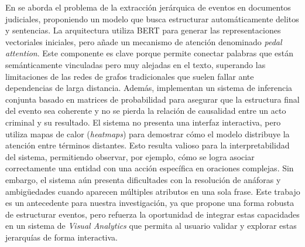 En \cite{shen2020hierarchical} se aborda el problema de la extracción jerárquica de eventos en documentos judiciales, proponiendo un modelo que busca estructurar automáticamente delitos y sentencias. La arquitectura utiliza \acs{BERT} para generar las representaciones vectoriales iniciales, pero añade un mecanismo de atención denominado \textit{pedal attention}. Este componente es clave porque permite conectar palabras que están semánticamente vinculadas pero muy alejadas en el texto, superando las limitaciones de las redes de grafos tradicionales que suelen fallar ante dependencias de larga distancia. Además, implementan un sistema de inferencia conjunta basado en matrices de probabilidad para asegurar que la estructura final del evento sea coherente y no se pierda la relación de causalidad entre un acto criminal y su resultado. El sistema no presenta una interfaz interactiva, pero utiliza mapas de calor (\textit{heatmaps}) para demostrar cómo el modelo distribuye la atención entre términos distantes. Esto resulta valioso para la interpretabilidad del sistema, permitiendo observar, por ejemplo, cómo se logra asociar correctamente una entidad con una acción específica en oraciones complejas. Sin embargo, el sistema aún presenta dificultades con la resolución de anáforas y ambigüedades cuando aparecen múltiples atributos en una sola frase. Este trabajo es un antecedente para nuestra investigación, ya que propone una forma robusta de estructurar eventos, pero refuerza la oportunidad de integrar estas capacidades en un sistema de \textit{Visual Analytics} que permita al usuario validar y explorar estas jerarquías de forma interactiva.












